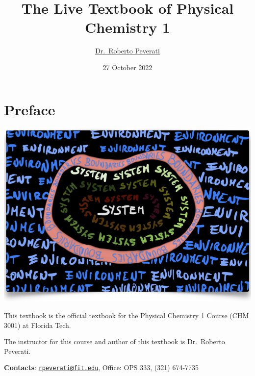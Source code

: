 \documentclass[
  9pt,
]{extbook}
\title{The Live Textbook of Physical Chemistry 1}
\author{\href{mailto:rpeverati@fit.edu}{Dr.~Roberto Peverati}}
\date{27 October 2022}
\let\oldmaketitle\maketitle
\theoremstyle{definition}
\theoremstyle{definition}
\theoremstyle{definition}
\theoremstyle{remark}
\begin{document}
\maketitle


%
\newpage

\let\maketitle\oldmaketitle

\renewcommand\thepage{\romannumeral\numexpr\value{page}-1\relax}


{
\setcounter{tocdepth}{1}
\tableofcontents
}
\renewcommand{\arraystretch}{1.8}

\hypertarget{preface}{%
\chapter*{Preface}\label{preface}}

\begin{center}\includegraphics[width=0.8\linewidth]{./img/OEP_Figures.000} \end{center}

This textbook is the official textbook for the Physical Chemistry 1 Course (CHM 3001) at Florida Tech.

The instructor for this course and author of this textbook is Dr.~Roberto Peverati.

\textbf{Contacts}: \href{mailto:rpeverati@fit.edu}{\nolinkurl{rpeverati@fit.edu}}, Office: OPS 333, (321) 674-7735
\end{document}

